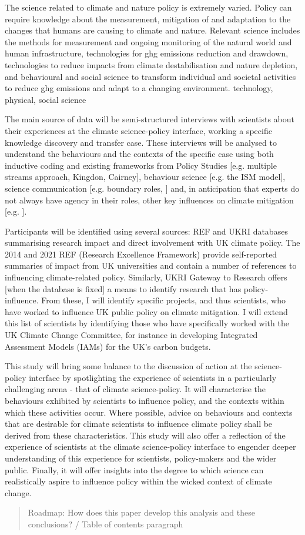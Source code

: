 The science related to climate and nature policy is extremely varied. Policy can require knowledge about the measurement, mitigation of and adaptation to the changes that humans are causing to climate and nature. Relevant science includes the methods for measurement and ongoing monitoring of the natural world and human infrastructure, technologies for ghg emissions reduction and drawdown, technologies to reduce impacts from climate destabilisation and nature depletion, and behavioural and social science to transform individual and societal activities to reduce ghg emissions and adapt to a changing environment. technology, physical, social science

The main source of data will be semi-structured interviews with scientists about their experiences at the climate science-policy interface, working a specific knowledge discovery and transfer case. These interviews will be analysed to understand the behaviours and the contexts of the specific case using both inductive coding and existing frameworks from Policy Studies [e.g. multiple streams approach, Kingdon, Cairney], behaviour science [e.g. the ISM model], science communication [e.g. boundary roles, \cite{RapleyD2014, GluckmanBK2021}] and, in anticipation that experts do not always have agency in their roles, other key influences on climate mitigation [e.g. \cite{StoddardEtAl2021}].

Participants will be identified using several sources: REF and UKRI databases summarising research impact and direct involvement with UK climate policy. The 2014 and 2021 REF (Research Excellence Framework) provide self-reported summaries of impact from UK universities and contain a number of references to influencing climate-related policy. Similarly, UKRI Gateway to Research offers [when the database is fixed] a means to identify research that has policy-influence. From these, I will identify specific projects, and thus scientists, who have worked to influence UK public policy on climate mitigation. I will extend this list of scientists by identifying those who have specifically worked with the UK Climate Change Committee, for instance in developing Integrated Assessment Models (IAMs) for the UK’s carbon budgets.

This study will bring some balance to the discussion of action at the science-policy interface by spotlighting the experience of scientists in a particularly challenging arena - that of climate science-policy. It will characterise the behaviours exhibited by scientists to influence policy, and the contexts within which these activities occur. Where possible, advice on behaviours and contexts that are desirable for climate scientists to influence climate policy shall be derived from these characteristics. This study will also offer a reflection of the experience of scientists at the climate science-policy interface to engender deeper understanding of this experience for scientists, policy-makers and the wider public. Finally, it will offer insights into the degree to which science can realistically aspire to influence policy within the wicked context of climate change.

\begin{quote}
    Roadmap: How does this paper develop this analysis and these conclusions? / Table of contents paragraph 
\end{quote}

